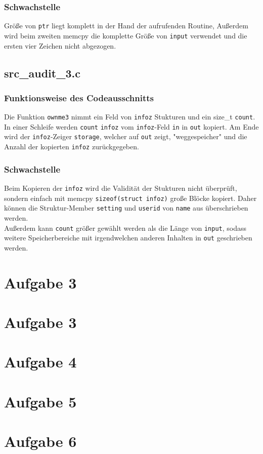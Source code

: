 \documentclass[11pt,a4paper]{article}
\begin{document}
\subsubsection{Schwachstelle}
Größe von \texttt{ptr} liegt komplett in der Hand der aufrufenden Routine, Außerdem wird beim zweiten memcpy die komplette Größe von \texttt{input} verwendet und die ersten vier Zeichen nicht abgezogen.
\subsection{src\_audit\_3.c}
\subsubsection{Funktionsweise des Codeausschnitts}
Die Funktion \texttt{ownme3} nimmt ein Feld von \texttt{infoz} Stukturen und ein size\_t \texttt{count}. In einer Schleife werden \texttt{count} \texttt{infoz} vom \texttt{infoz}-Feld \texttt{in} in \texttt{out} kopiert. Am Ende wird der \texttt{infoz}-Zeiger \texttt{storage}, welcher auf \texttt{out} zeigt, "weggespeicher" und die Anzahl der kopierten \texttt{infoz} zurückgegeben.
\subsubsection{Schwachstelle}
Beim Kopieren der \texttt{infoz} wird die Validität der Stukturen nicht überprüft, sondern einfach mit memcpy \texttt{sizeof(struct infoz)} große Blöcke kopiert. Daher können die Struktur-Member \texttt{setting} und \texttt{userid} von \texttt{name} aus überschrieben werden.\\
Außerdem kann \texttt{count} größer gewählt werden als die Länge von \texttt{input}, sodass weitere Speicherbereiche mit irgendwelchen anderen Inhalten in \texttt{out} geschrieben werden.
\section{Aufgabe 3}
\section{Aufgabe 3}
\section{Aufgabe 4}
\section{Aufgabe 5}
\section{Aufgabe 6}
\end{document}
